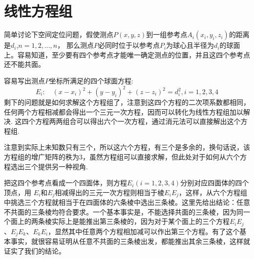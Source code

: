 
\section{线性方程组}
\label{sec:linear-equations-system}

\begin{example}[简单的三维定位]
  简单讨论下空间定位问题，假使测点$P(x,y,z)$到一组参考点$A_i(x_i,y_i,z_i)$的距离是$d_i$,$n=1,2,\ldots,n$， 那么测点$P$必同时位于以参考点$P_i$为球心且半径为$d_i$的球面上。容易知道，至少要有四个参考点才能唯一确定测点的位置，并且这四个参考点还不能共面。

  容易写出测点$P$坐标所满足的四个球面方程:
  \[ E_i: \quad (x-x_i)^2+(y-y_i)^2+(z-z_i)^2=d_i^2, i = 1,2,3,4 \]
  剩下的问题就是如何求解这个方程组了，注意到这四个方程的二次项系数都相同，任何两个方程相减都会得出一个三元一次方程，因而可以转化为线性方程组加以解决. 这四个方程两两组合可以得出六个一次方程，通过消元法可以直接解出这个方程组.
  
  注意到实际上未知数只有三个，所以这六个方程，有三个是多余的，换句话说，该方程组的增广矩阵的秩为3，虽然方程组可以直接求解，但此处对于如何从六个方程选出三个提供另一种视角.

 把这四个参考点看成一个四面体，则方程$E_i(i=1,2,3,4)$分别对应四面体的四个顶点，用 $E_i$和$E_j$相减得出的三元一次方程则相当于棱$E_iE_j$，这样，从六个方程组中挑选三个方程就相当于在四面体的六条棱中选出三条棱。这里先给出结论：任意不共面的三条棱均符合要求。一个基本事实是，不能选择共面的三条棱，因为同一个面上的两条棱实际上是能推出第三条棱的，因为对于某个面上的三个方程$E_iE_j$、$E_jE_k$、$E_kE_i$，显然其中任意两个方程相加减可以作出第三个方程。有了这个基本事实，就很容易证明从任意不共面的三条棱出发，都能推出其余三条棱，这样就证实了我们的结论。
\end{example}
